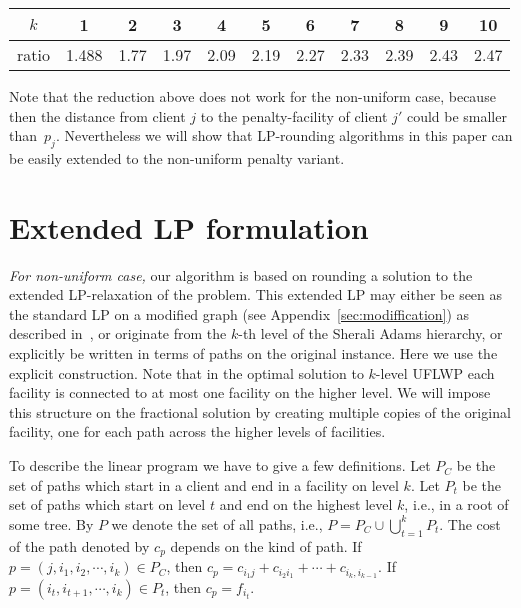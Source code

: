 \documentclass{llncs}
\newcommand{\va}[1]{{\color{black}\sl  #1}}
\begin{document}
\begin{center}
  \begin{tabular}{ c | c | c | c | c | c | c | c | c | c | c }
    $k$ & 1 & 2 & 3 & 4 & 5 & 6 & 7 & 8 & 9 & 10 \\ \hline
    ratio & 1.488 & 1.77 & 1.97 & 2.09 & 2.19 & 2.27 &2.33 & 2.39 & 2.43 & 2.47 \\
  \end{tabular}
\end{center}

Note that the reduction above does not work for the non-uniform case, because then the distance from client $j$ to the penalty-facility of client $j'$ could be smaller than~$p_j$.
Nevertheless we will show that LP-rounding algorithms in this paper can be easily extended to the non-uniform penalty variant.

\section{Extended LP formulation}

\va{For non-uniform case,} our algorithm is based on rounding a solution to the extended LP-relaxation of the problem. This extended LP may either be seen as the standard LP on a modified graph (see Appendix~\ref{sec:modiffication})
as described in~\cite{Rybicki}, or originate from the $k$-th level of the Sherali Adams hierarchy, or explicitly be written in terms of paths on the original instance. Here we use the explicit construction.
Note that in the optimal solution to $k$-level UFLWP each facility is connected to at most one facility on the higher level. We will impose this structure on the fractional solution
by creating multiple copies of the original facility, one for each path across the higher levels of facilities.

To describe the linear program we have to give a few definitions. Let $P_C$ be the set of paths which start in a client and end in a facility on level $k$. Let $P_t$ be the set of paths which start on level $t$ and end on the highest level $k$, i.e., in a root of some tree.
By $P$ we denote the set of all paths, i.e.,  $P = P_C \cup \bigcup_{t=1}^{k} P_{t}$. The cost of the path denoted by $c_p$ depends on the kind of path.
If $p = (j, i_1, i_2, \cdots, i_k) \in P_C$, then $c_p = c_{i_1 j} + c_{i_2 i_1} + \cdots + c_{i_{k}, i_{k-1}}$.
If $p = (i_t, i_{t+1}, \cdots, i_k) \in P_{t}$, then $c_p = f_{i_t}$.
\end{document}
